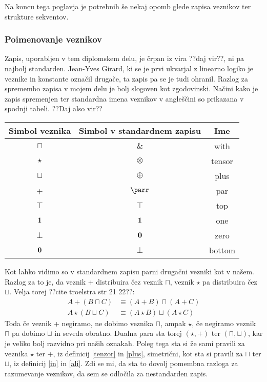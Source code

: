 Na koncu tega poglavja je potrebnih še nekaj opomb glede zapisa veznikov ter strukture sekventov.

\subsubsection{Poimenovanje veznikov}

Zapis, uporabljen v tem diplomskem delu, je črpan iz vira ??daj vir??, ni pa najbolj standarden. Jean-Yves Girard, ki se je prvi ukvarjal z linearno logiko je veznike in konstante označil drugače, ta zapis pa se je tudi ohranil. Razlog za spremembo zapisa v mojem delu je bolj slogoven kot zgodovinski. Načini kako je zapis spremenjen ter standardna imena veznikov v angleščini so prikazana v spodnji tabeli. ??Daj also vir?? %
\begin{center}
\begin{tabular}{||c|c|c||}
    \hline
    Simbol veznika & Simbol v standardnem zapisu & Ime \\
    \hline\hline
    $\sqcap$ & $\&$ & with \\
    \hline
    $\star$ & $\otimes$ & tensor \\
    \hline
    $\sqcup$ & $\oplus$ & plus \\
    \hline
    + & $\parr$ & par \\
    \hline
    $\top$ & $\top$ & top \\
    \hline
    $\mathbf{1}$ & $\mathbf{1}$ & one \\
    \hline
    $\bot$ & $\mathbf{0}$ & zero \\
    \hline
    $\mathbf{0}$ & $\bot$ & bottom \\
    \hline
    \end{tabular}
\end{center}
Kot lahko vidimo so v standardnem zapisu parni drugačni vezniki kot v našem. Razlog za to je, da veznik + distribuira čez veznik $\sqcap$, veznik $\star$ pa distribuira čez $\sqcup$. Velja torej ??cite troelstra str 21 22??:
\begin{align*}
    A + (B \sqcap C) &\equiv (A + B) \sqcap (A + C)\\
    A \star (B \sqcup C) &\equiv (A \star B) \sqcup (A \star C)
\end{align*}
Toda če veznik + negiramo, ne dobimo veznika $\sqcap$, ampak $\star$, če negiramo veznik $\sqcap$ pa dobimo $\sqcup$ in seveda obratno. Dualna para sta torej $(\star,+)$ ter $(\sqcap,\sqcup)$, kar je veliko bolj razvidno pri naših oznakah. Poleg tega sta si že sami pravili za veznika $\star$ ter +, iz definicij \ref{tenzor} in \ref{plus}, simetrični, kot sta si pravili za $\sqcap$ ter $\sqcup$, iz definicij \ref{in} in \ref{ali}. Zdi se mi, da sta to dovolj pomembna razloga za razumevanje veznikov, da sem se odločila za nestandarden zapis.

